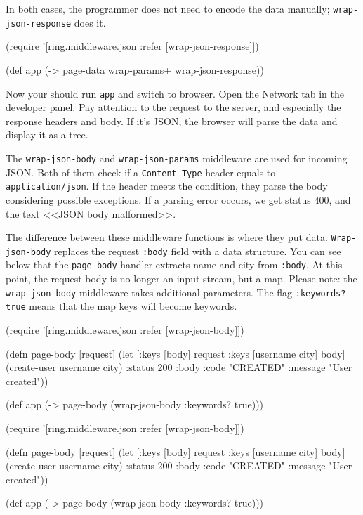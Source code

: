 \fi

\noindent In both cases, the programmer does not need to encode the data manually; \verb|wrap-json-response| does it.

\begin{clojure}
(require '[ring.middleware.json
           :refer [wrap-json-response]])

(def app (-> page-data
             wrap-params+
             wrap-json-response))
\end{clojure}

Now your should run \verb|app| and switch to browser. Open the Network tab in the developer panel. Pay attention to the request to the server, and especially the response headers and body. If it's JSON, the browser will parse the data and display it as a tree.

The \verb|wrap-json-body| and \verb|wrap-json-params| middleware are used for incoming JSON. Both of them check if a \verb|Content-Type| header equals to \verb|application/json|. If the header meets the condition, they parse the body considering possible exceptions. If a parsing error occurs, we get status 400, and the text <<JSON body malformed>>.

The difference between these middleware functions is where they put data. \verb|Wrap-json-body| replaces the request \verb|:body| field with a data structure. You can see below that the \verb|page-body| handler extracts name and city from \verb|:body|. At this point, the request body is no longer an input stream, but a map. Please note: the \verb|wrap-json-body| middleware takes additional parameters. The flag \verb|:keywords? true| means that the map keys will become keywords.

\ifx\DEVICETYPE\MOBILE

\begin{clojure}
(require '[ring.middleware.json
           :refer [wrap-json-body]])

(defn page-body [request]
  (let [{:keys [body]} request
        {:keys [username city]} body]
    (create-user username city)
    {:status 200
     :body {:code "CREATED"
            :message "User created"}}))

(def app
  (->
    page-body
    (wrap-json-body {:keywords? true})))
\end{clojure}

\else

\begin{clojure}
(require '[ring.middleware.json :refer [wrap-json-body]])

(defn page-body [request]
  (let [{:keys [body]} request
        {:keys [username city]} body]
    (create-user username city)
    {:status 200
     :body {:code "CREATED"
            :message "User created"}}))

(def app (-> page-body
             (wrap-json-body {:keywords? true})))
\end{clojure}

